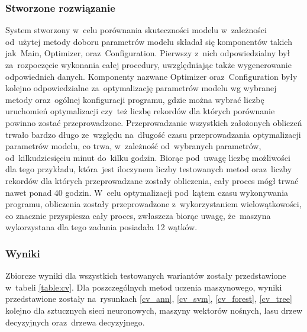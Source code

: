 \subsubsection{Stworzone rozwiązanie}
System stworzony w~celu porównania skuteczności modelu w~zależności od~użytej metody doboru parametrów modelu składał się komponentów takich jak~Main, Optimizer, oraz~Configuration. Pierwszy z~nich odpowiedzialny był za~rozpoczęcie wykonania całej procedury, uwzględniając także wygenerowanie odpowiednich danych. Komponenty nazwane Optimizer oraz~Configuration były kolejno odpowiedzialne za~optymalizację parametrów modelu wg wybranej metody oraz~ogólnej konfiguracji programu, gdzie można wybrać liczbę uruchomień optymalizacji czy~też liczbę rekordów dla których porównanie powinno zostać przeprowadzone. Przeprowadzanie wszystkich założonych obliczeń trwało bardzo długo ze~względu na~długość czasu przeprowadzania optymalizacji parametrów modelu, co trwa, w~zależność od~wybranych parametrów, od~kilkudziesięciu minut do~kilku godzin. Biorąc pod~uwagę liczbę możliwości dla tego przykładu, która~jest iloczynem liczby testowanych metod oraz~liczby rekordów dla których przeprowadzane zostały obliczenia, cały proces mógł trwać nawet ponad 40 godzin. W~celu optymalizacji pod~kątem czasu wykonywania programu, obliczenia zostały przeprowadzone z~wykorzystaniem wielowątkowości, co znacznie przyspiesza cały proces, zwłaszcza biorąc uwagę, że~maszyna wykorzystana dla tego zadania posiadała 12 wątków. 
 
\subsubsection{Wyniki}
Zbiorcze wyniki dla wszystkich testowanych wariantów zostały przedstawione w~tabeli \ref{table:cv}. Dla poszczególnych metod uczenia maszynowego, wyniki przedstawione zostały na~rysunkach \ref{cv_ann}, \ref{cv_svm}, \ref{cv_forest}, \ref{cv_tree} kolejno dla sztucznych sieci neuronowych, maszyny wektorów nośnych, lasu drzew decyzyjnych oraz~drzewa decyzyjnego.

